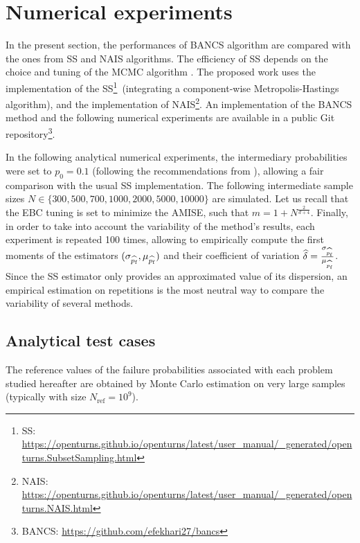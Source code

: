 \section{Numerical experiments}\label{sec:bancs_bench}
In the present section, the performances of BANCS algorithm are compared with the ones from SS and NAIS algorithms. 
The efficiency of SS depends on the choice and tuning of the MCMC algorithm \citep{Papaioannou_PEM_2015}. 
The proposed work uses the \ots implementation of the SS\footnote{SS: \url{https://openturns.github.io/openturns/latest/user_manual/_generated/openturns.SubsetSampling.html}}~(integrating a component-wise Metropolis-Hastings algorithm), 
and the \ots implementation of NAIS\footnote{NAIS: \url{https://openturns.github.io/openturns/latest/user_manual/_generated/openturns.NAIS.html}}.
An implementation of the BANCS method and the following numerical experiments are available in a public Git repository\footnote{BANCS: \url{https://github.com/efekhari27/bancs}}. 

In the following analytical numerical experiments, the intermediary probabilities were set to $p_0=0.1$ (following the recommendations from \citealp{AuBeck2001}), allowing a fair comparison with the usual SS implementation. 
The following intermediate sample sizes $N \in \{300, 500, 700, 1000, 2000, 5000, 10000\}$ are simulated.
Let us recall that the EBC tuning is set to minimize the AMISE, such that $m = 1 + N^{\frac{2}{d+4}}$. 
Finally, in order to take into account the variability of the method's results, each experiment is repeated 100 times, allowing to empirically compute the first moments of the estimators $(\sigma_{\widehat{p_\mathrm{f}}}, \mu_{\widehat{p_\mathrm{f}}})$ and their coefficient of variation $\widehat{\delta} = \frac{\sigma_{\widehat{p_\mathrm{f}}}}{\mu_{\widehat{p_\mathrm{f}}}}$. 
Since the SS estimator only provides an approximated value of its dispersion, an empirical estimation on repetitions is the most neutral way to compare the variability of several methods. 


\subsection{Analytical test cases}\label{sec:testcases}
The reference values of the failure probabilities associated with each problem studied hereafter are obtained by Monte Carlo estimation on very large samples (typically with size $N_{\mathrm{ref}} = 10^9$). 

